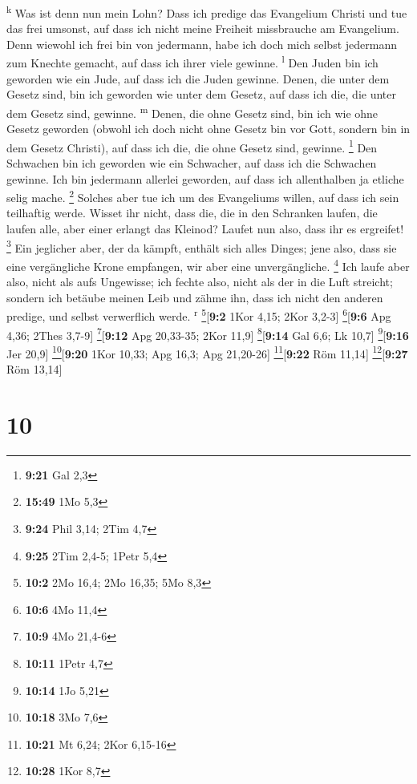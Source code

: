 \textsuperscript{k}  Was ist denn nun mein Lohn? Dass ich
predige das Evangelium Christi und tue das frei umsonst, auf dass ich
nicht meine Freiheit missbrauche am Evangelium.  Denn
wiewohl ich frei bin von jedermann, habe ich doch mich selbst jedermann
zum Knechte gemacht, auf dass ich ihrer viele gewinne.
\textsuperscript{l}  Den Juden bin ich geworden wie ein
Jude, auf dass ich die Juden gewinne. Denen, die unter dem Gesetz sind,
bin ich geworden wie unter dem Gesetz, auf dass ich die, die unter dem
Gesetz sind, gewinne. \textsuperscript{m}  Denen, die
ohne Gesetz sind, bin ich wie ohne Gesetz geworden (obwohl ich doch
nicht ohne Gesetz bin vor Gott, sondern bin in dem Gesetz Christi), auf
dass ich die, die ohne Gesetz sind, gewinne. \footnote{\textbf{9:21} Gal
  2,3}  Den Schwachen bin ich geworden wie ein Schwacher,
auf dass ich die Schwachen gewinne. Ich bin jedermann allerlei geworden,
auf dass ich allenthalben ja etliche selig mache. \footnote{\textbf{15:49}
  1Mo 5,3}  Solches aber tue ich um des Evangeliums
willen, auf dass ich sein teilhaftig werde.  Wisset ihr
nicht, dass die, die in den Schranken laufen, die laufen alle, aber
einer erlangt das Kleinod? Laufet nun also, dass ihr es ergreifet!
\footnote{\textbf{9:24} Phil 3,14; 2Tim 4,7}  Ein
jeglicher aber, der da kämpft, enthält sich alles Dinges; jene also,
dass sie eine vergängliche Krone empfangen, wir aber eine
unvergängliche. \footnote{\textbf{9:25} 2Tim 2,4-5; 1Petr 5,4}
 Ich laufe aber also, nicht als aufs Ungewisse; ich
fechte also, nicht als der in die Luft streicht;  sondern
ich betäube meinen Leib und zähme ihn, dass ich nicht den anderen
predige, und selbst verwerflich werde. \textsuperscript{r}
\footnote{\textbf{10:2} 2Mo 16,4; 2Mo 16,35; 5Mo 8,3}{[}\textbf{9:2}
1Kor 4,15; 2Kor 3,2-3{]} \footnote{\textbf{10:6} 4Mo 11,4}{[}\textbf{9:6}
Apg 4,36; 2Thes 3,7-9{]} \footnote{\textbf{10:9} 4Mo 21,4-6}{[}\textbf{9:12}
Apg 20,33-35; 2Kor 11,9{]} \footnote{\textbf{10:11} 1Petr 4,7}{[}\textbf{9:14}
Gal 6,6; Lk 10,7{]} \footnote{\textbf{10:14} 1Jo 5,21}{[}\textbf{9:16}
Jer 20,9{]} \footnote{\textbf{10:18} 3Mo 7,6}{[}\textbf{9:20} 1Kor
10,33; Apg 16,3; Apg 21,20-26{]} \footnote{\textbf{10:21} Mt 6,24; 2Kor
  6,15-16}{[}\textbf{9:22} Röm 11,14{]} \footnote{\textbf{10:28} 1Kor
  8,7}{[}\textbf{9:27} Röm 13,14{]}

\hypertarget{section-9}{%
\section{10}\label{section-9}}


